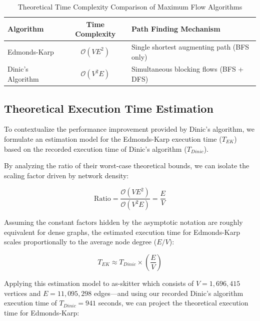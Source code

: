 \documentclass[12pt,a4paper]{article}
\begin{document}
\begin{table}[htbp]
    \centering
    \label{tab:complexity_comparison}
    \renewcommand{\arraystretch}{1.3}
    \begin{tabular}{@{} l c p{6.5cm} @{}}
        \toprule
        \textbf{Algorithm} & \textbf{Time Complexity} & \textbf{Path Finding Mechanism} \\
        \midrule
        Edmonds-Karp & $\mathcal{O}(V E^2)$ & Single shortest augmenting path \newline (BFS only) \\
        Dinic's Algorithm & $\mathcal{O}(V^2 E)$ & Simultaneous blocking flows \newline (BFS + DFS) \\
        \bottomrule
    \end{tabular}
    \caption{Theoretical Time Complexity Comparison of Maximum Flow Algorithms}
\end{table}

\subsection*{Theoretical Execution Time Estimation}

To contextualize the performance improvement provided by Dinic's algorithm, we formulate an estimation model for the Edmonds-Karp execution time ($T_{EK}$) based on the recorded execution time of Dinic's algorithm ($T_{Dinic}$). 

By analyzing the ratio of their worst-case theoretical bounds, we can isolate the scaling factor driven by network density:

\begin{equation}
    \text{Ratio} = \frac{\mathcal{O}(V E^2)}{\mathcal{O}(V^2 E)} = \frac{E}{V}
\end{equation}

Assuming the constant factors hidden by the asymptotic notation are roughly equivalent for dense graphs, the estimated execution time for Edmonds-Karp scales proportionally to the average node degree ($E/V$):

\begin{equation}
    T_{EK} \approx T_{Dinic} \times \left( \frac{E}{V} \right)
\end{equation}

Applying this estimation model to as-skitter which consists of $V = 1,696,415$ vertices and $E = 11,095,298$ edges—and using our recorded Dinic's algorithm execution time of $T_{Dinic} = 941$ seconds, we can project the theoretical execution time for Edmonds-Karp:
\end{document}
